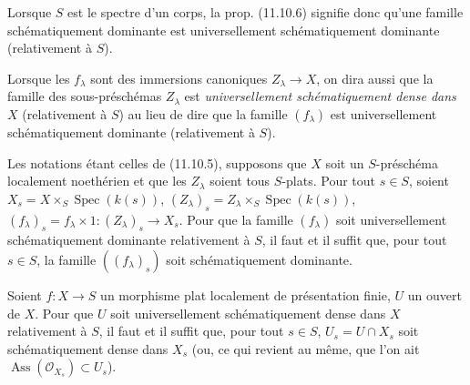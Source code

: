Lorsque $S$ est le spectre d'un corps, la prop. (11.10.6) signifie donc qu'une
famille schématiquement dominante est universellement schématiquement
dominante (relativement à $S$).

Lorsque les $f_\lambda$ sont des immersions canoniques $Z_\lambda\to X$, on
dira aussi que la famille des sous-préschémas $Z_\lambda$ est
\emph{universellement schématiquement dense dans $X$} (relativement à $S$) au
lieu de dire que la famille $(f_\lambda)$ est universellement schématiquement
dominante (relativement à $S$).

\begin{theorem}[11.10.9]
\label{IV.11.10.9-fr}
Les notations étant celles de (11.10.5), supposons que $X$ soit un
$S$-préschéma localement noethérien et que les $Z_\lambda$ soient tous
$S$-plats. Pour tout $s\in S$, soient
$X_s=X\times_S\operatorname{Spec}(k(s))$,
$(Z_\lambda)_s=Z_\lambda\times_S\operatorname{Spec}(k(s))$,
$(f_\lambda)_s=f_\lambda\times1:(Z_\lambda)_s\to X_s$. Pour que la famille
$(f_\lambda)$ soit universellement schématiquement dominante relativement à
$S$, il faut et il suffit que, pour tout $s\in S$, la famille
$((f_\lambda)_s)$ soit schématiquement dominante.
\end{theorem}

\begin{proposition}[11.10.10]
\label{IV.11.10.10-fr}
Soient $f:X\to S$ un morphisme plat localement de présentation finie, $U$ un
ouvert de $X$. Pour que $U$ soit universellement schématiquement dense dans
$X$ relativement à $S$, il faut et il suffit que, pour tout $s\in S$,
$U_s=U\cap X_s$ soit schématiquement dense dans $X_s$ (ou, ce qui revient au
même, que l'on ait $\operatorname{Ass}(\mathcal O_{X_s})\subset U_s$).
\end{proposition}
